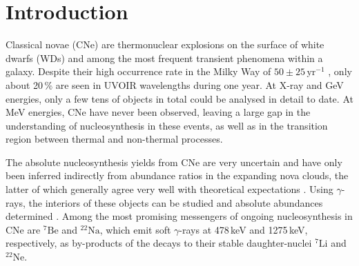 \documentclass{aa}
\newcommand{\mrm}[1]{\mathrm{#1}}
\newcommand{\nuc}[2]{$\mrm{^{#2}#1}$}
\begin{document}

   \maketitle
%

\section{Introduction}\label{sec:intro}
%
Classical novae (CNe) are thermonuclear explosions on the surface of white dwarfs (WDs) and among the most frequent transient phenomena within a galaxy.
%
Despite their high occurrence rate in the Milky Way of $50 \pm 25\,\mrm{yr^{-1}}$ \citep{Shafter2017_novarate}, only about 20\,\% are seen in UVOIR wavelengths during one year.
%
At X-ray \citep{Ness2007_Swiftnovae} and GeV \citep{Franckowiak2018_FermiLATnovae} energies, only a few tens of objects in total could be analysed in detail to date.
%
At MeV energies, CNe have never been observed, leaving a large gap in the understanding of nucleosynthesis in these events, as well as in the transition region between thermal and non-thermal processes.

The absolute nucleosynthesis yields from CNe are very uncertain and have only been inferred indirectly from abundance ratios in the expanding nova clouds, the latter of which generally agree very well with theoretical expectations \citep[e.g.,][]{Livio1994_nova_abundances}.
%
Using $\gamma$-rays, the interiors of these objects can be studied and absolute abundances determined \citep[e.g.,][]{Clayton1974_novae,Clayton1981_novae7Li,Leising1987_nova_511,Hernanz2006_novae,Hernanz2014_nova}.
%
Among the most promising messengers of ongoing nucleosynthesis in CNe are \nuc{Be}{7} and \nuc{Na}{22}, which emit soft $\gamma$-rays at 478\,keV and 1275\,keV, respectively, as by-products of the decays to their stable daughter-nuclei \nuc{Li}{7} and \nuc{Ne}{22}.
\end{document}
